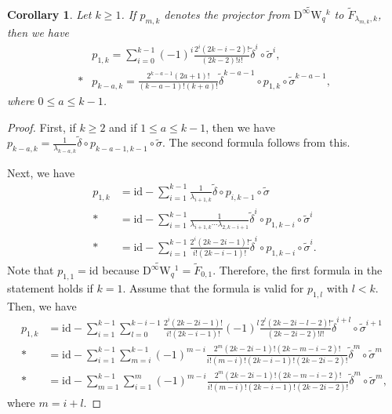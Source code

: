 \documentclass[12pt]{amsart}
\newcommand{\W}{\mathrm{W}}
\newcommand{\D}{\mathrm{D}}
\newcommand{\id}{{\mathrm{id}}}
\newtheorem{corollary}[theorem]{Corollary}
\theoremstyle{definition}
\theoremstyle{remark}
\begin{document}
\begin{corollary}
\label{cor9.6}
Let $k\geq1$.
If $p_{m,k}$ denotes the projector from $\widetilde{\D^\infty\W_q}{}^k$ to $\widetilde{F}_{\lambda_{m,k},k}$, then we have
\begin{align*}
&p_{1,k}=\sum_{i=0}^{k-1}(-1)^i\frac{2^i(2k-i-2)!}{(2k-2)!i!}\widetilde\delta^i\circ\widetilde\sigma^i,\\*
&p_{k-a,k}=\frac{2^{k-a-1}(2a+1)!}{(k-a-1)!(k+a)!}\widetilde\delta^{k-a-1}\circ p_{1,k}\circ\widetilde\sigma^{k-a-1},
\end{align*}
where $0\leq a\leq k-1$.
\end{corollary}
\begin{proof}
First, if $k\geq2$ and if $1\leq a\leq k-1$, then we have $p_{k-a,k}=\frac1{\lambda_{k-a,k}}\widetilde\delta\circ p_{k-a-1,k-1}\circ\widetilde\sigma$.
The second formula follows from this.

Next, we have
\begin{align*}
p_{1,k}&=\id-\sum_{i=1}^{k-1}\frac1{\lambda_{i+1,k}}\widetilde\delta\circ p_{i,k-1}\circ\widetilde\sigma\\*
&=\id-\sum_{i=1}^{k-1}\frac1{\lambda_{i+1,k}\cdots\lambda_{2,k-i+1}}\widetilde\delta^i\circ p_{1,k-i}\circ\widetilde\sigma^i\\*
&=\id-\sum_{i=1}^{k-1}\frac{2^i(2k-2i-1)!}{i!(2k-i-1)!}\widetilde\delta^i\circ p_{1,k-i}\circ\widetilde\sigma^i.
\end{align*}
Note that $p_{1,1}=\id$ because $\widetilde{\D^\infty\W_q}{}^1=\widetilde{F}_{0,1}$.
Therefore, the first formula in the statement holds if $k=1$.
Assume that the formula is valid for $p_{1,l}$ with $l<k$.
Then, we have
\begin{align*}
p_{1,k}&=\id-\sum_{i=1}^{k-1}\sum_{l=0}^{k-i-1}\frac{2^i(2k-2i-1)!}{i!(2k-i-1)!}(-1)^l\frac{2^l(2k-2i-l-2)!}{(2k-2i-2)!l!}\widetilde\delta^{i+l}\circ\widetilde\sigma^{i+1}\\*
&=\id-\sum_{i=1}^{k-1}\sum_{m=i}^{k-1}(-1)^{m-i}\frac{2^m(2k-2i-1)!(2k-m-i-2)!}{i!(m-i)!(2k-i-1)!(2k-2i-2)!}\widetilde\delta^m\circ\widetilde\sigma^m\\*
&=\id-\sum_{m=1}^{k-1}\sum_{i=1}^m(-1)^{m-i}\frac{2^m(2k-2i-1)!(2k-m-i-2)!}{i!(m-i)!(2k-i-1)!(2k-2i-2)!}\widetilde\delta^m\circ\widetilde\sigma^m,
\end{align*}
where $m=i+l$.


\end{proof}
\end{document}

